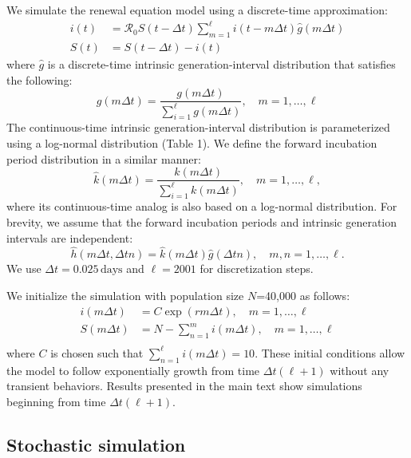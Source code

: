 \documentclass[12pt]{article}
\newcommand{\Rx}[1]{\ensuremath{{\mathcal R}_{#1}}\xspace}
\newcommand{\Ro}{\Rx{0}}
\newcommand{\gdist}{g} %
\begin{document}
We simulate the renewal equation model using a discrete-time approximation:
\begin{equation}
\begin{aligned}
i(t) &= \Ro S(t-\Delta t) \sum_{m=1}^{\ell} i(t-m \Delta t) \hat{\gdist}(m \Delta t) \\
S(t) &= S(t-\Delta t) - i(t)
\end{aligned}
\end{equation}
where $\hat{\gdist}$ is a discrete-time intrinsic generation-interval distribution that satisfies the following:
\begin{equation}
\hat{\gdist}(m \Delta t) = \frac{\gdist(m \Delta t)}{\sum_{i=1}^\ell \gdist(m \Delta t)}, \quad m=1, \dots, \ell
\end{equation}
The continuous-time intrinsic generation-interval distribution is parameterized using a log-normal distribution (Table 1). We define the forward incubation period distribution in a similar manner:
\begin{equation}
\hat{k}(m \Delta t) = \frac{k(m \Delta t)}{\sum_{i=1}^\ell k(m \Delta t)}, \quad m=1, \dots, \ell,
\end{equation}
where its continuous-time analog is also based on a log-normal distribution.
For brevity, we assume that the forward incubation periods and intrinsic generation intervals are independent:
\begin{equation}
\hat{h}(m \Delta t, \Delta t n) = \hat{k}(m \Delta t)\hat{\gdist}(\Delta t n), \quad m,n=1, \dots, \ell.
\end{equation}
We use $\Delta t = 0.025\,\textrm{days}$ and $\ell=2001$ for discretization steps.

We initialize the simulation with population size $N$=40,000 as follows:
\begin{equation}
\begin{aligned}
i(m \Delta t) &= C \exp(r m \Delta t), \quad m=1, \dots, \ell\\
S(m \Delta t) &= N - \sum_{n=1}^m i(m \Delta t), \quad m=1, \dots, \ell\\
\end{aligned}
\end{equation}
where $C$ is chosen such that $\sum_{n=1}^\ell i(m \Delta t)=10$.
These initial conditions allow the model to follow exponentially growth from time $\Delta t (\ell + 1)$ without any transient behaviors.
Results presented in the main text show simulations beginning from time $\Delta t (\ell + 1)$.

\subsection{Stochastic simulation}
\end{document}
